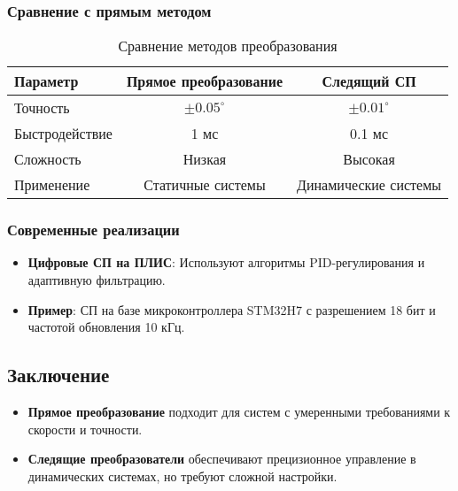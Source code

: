 \subsubsection*{Сравнение с прямым методом}
\begin{table}[ht]
    \centering
    \caption{Сравнение методов преобразования}
    \begin{tabular}{|l|c|c|}
        \hline
        \textbf{Параметр} & \textbf{Прямое преобразование} & \textbf{Следящий СП} \\ \hline
        Точность & \(\pm0.05^\circ\) & \(\pm0.01^\circ\) \\ \hline
        Быстродействие & 1 мс & 0.1 мс \\ \hline
        Сложность & Низкая & Высокая \\ \hline
        Применение & Статичные системы & Динамические системы \\ \hline
    \end{tabular}
\end{table}

\subsubsection*{Современные реализации}
\begin{itemize}
    \item \textbf{Цифровые СП на ПЛИС}: Используют алгоритмы PID-регулирования и адаптивную фильтрацию.
    \item \textbf{Пример}: СП на базе микроконтроллера STM32H7 с разрешением 18 бит и частотой обновления 10 кГц.
\end{itemize}

\subsection*{Заключение}
\begin{itemize}
    \item \textbf{Прямое преобразование} подходит для систем с умеренными требованиями к скорости и точности.
    \item \textbf{Следящие преобразователи} обеспечивают прецизионное управление в динамических системах, но требуют сложной настройки.
\end{itemize}


